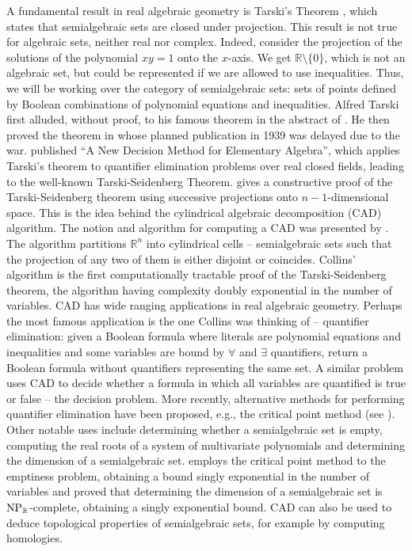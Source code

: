 \documentclass[
]{book}
\theoremstyle{definition}
\theoremstyle{definition}
\theoremstyle{definition}
\theoremstyle{definition}
\theoremstyle{remark}
\begin{document}
A fundamental result in real algebraic geometry is Tarski's Theorem \citep{vdd1988tarski}, which states that semialgebraic sets are closed under projection.
This result is not true for algebraic sets, neither real nor complex. Indeed, consider the projection of the solutions of the polynomial \(xy = 1\) onto the \(x\)-axis. We get \(\mathbb{R}\setminus \{ 0 \}\), which is not an algebraic set, but could be represented if we are allowed to use inequalities. Thus, we will be working over the category of semialgebraic sets: sets of points defined by Boolean combinations of polynomial equations and inequalities.
Alfred Tarski first alluded, without proof, to his famous theorem in the abstract of \citet{sierpinski1930}. He then proved the
theorem in \citep{tarski1998} whose planned publication in 1939 was delayed due to the war. \citet{seidenberg1954} published ``A New Decision Method for Elementary Algebra'', which applies Tarski's theorem to quantifier elimination problems over real closed fields, leading to the well-known Tarski-Seidenberg Theorem.
\citet{lojasiewicz1964} gives a constructive proof of the Tarski-Seidenberg theorem using successive projections onto \(n-1\)-dimensional space. This is the idea behind the cylindrical algebraic decomposition (CAD) algorithm.
The notion and algorithm for computing a CAD was presented by \citet{collins1975}.
The algorithm partitions \(\mathbb{R}^n\) into cylindrical cells -- semialgebraic sets such that the projection of any two of them is either disjoint or coincides.
Collins' algorithm is the first computationally tractable proof of the Tarski-Seidenberg theorem, the algorithm having complexity doubly exponential in the number of variables.
CAD has wide ranging applications in real algebraic geometry.
Perhaps the most famous application is the one Collins was thinking of -- quantifier elimination: given a Boolean formula where literals are polynomial equations and inequalities and some variables are bound by \(\forall\) and \(\exists\) quantifiers, return a Boolean formula without quantifiers representing the same set.
A similar problem uses CAD to decide whether a formula in which all variables are quantified is true or false -- the decision problem.
More recently, alternative methods for performing quantifier elimination have been proposed, e.g., the critical point method (see \citet{safeldin2013}).
Other notable uses include determining whether a semialgebraic set is empty, computing the real roots of a system of multivariate polynomials and determining the dimension of a semialgebraic set. \citet{bpr98} employs the critical point method to the emptiness problem, obtaining a bound singly exponential in the number of variables and \citet{koiran1999} proved that determining the dimension of a semialgebraic set is \(\rm{NP}_{\mathbb{R}}\)-complete, obtaining a singly exponential bound.
CAD can also be used to deduce topological properties of semialgebraic sets, for example by computing homologies.
\end{document}

